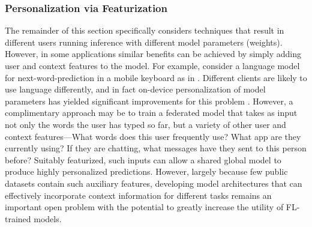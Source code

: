 \documentclass[11pt]{article}
\begin{document}
\subsubsection{Personalization via Featurization}
The remainder of this section specifically considers techniques that result in different users running inference with different model parameters (weights). However, in some applications similar benefits can be achieved by simply adding user and context features to the model. For example, consider a language model for next-word-prediction in a mobile keyboard as in \citet{hard18gboard}. Different clients are likely to use language differently, and in fact on-device personalization of model parameters has yielded significant improvements for this problem \citep{wang2019federated}. However, a complimentary approach may be to train a federated model that takes as input not only the words the user has typed so far, but a variety of other user and context features---What words does this user frequently use? What app are they currently using? If they are chatting, what messages have they sent to this person before? Suitably featurized, such inputs can allow a shared global model to produce highly personalized predictions. However, largely because few public datasets contain such auxiliary features, developing model architectures that can effectively incorporate context information for different tasks remains an important open problem with the potential to greatly increase the utility of FL-trained models.  



\end{document}

